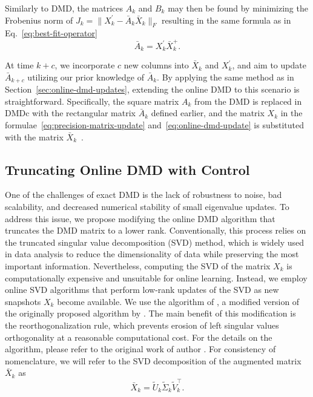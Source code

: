Similarly to DMD, the matrices \(A_k\) and \(B_k\) may then be found by minimizing the Frobenius norm of \(J_k = \|X^\prime_k - \bar{A}_k \bar{X}_k\|_F\) resulting in the same  formula as in Eq.~\eqref{eq:best-fit-operator}
\begin{equation*}
	\bar{A}_k = X^\prime_k \bar{X}_k^+.
\end{equation*}

At time \(k+c\), we incorporate \(c\) new columns into \(\bar{X}_k\) and \(X^\prime_k\), and aim to update \(\bar{A}_{k+c}\) utilizing our prior knowledge of \(\bar{A}_k\). By applying the same method as in Section~\ref{sec:online-dmd-updates}, extending the online DMD to this scenario is straightforward. Specifically, the square matrix \(A_k\) from the DMD is replaced in DMDc with the rectangular matrix \(\bar{A}_k\) defined earlier, and the matrix \(X_k\) in the formulae~\eqref{eq:precision-matrix-update} and~\eqref{eq:online-dmd-update} is substituted with the matrix \(\bar{X}_k\)~\citep{Zhang2019}.

\subsection{Truncating Online DMD with Control}\label{sec:truncating-online-dmd}
One of the challenges of exact DMD is the lack of robustness to noise, bad scalability, and decreased numerical stability of small eigenvalue updates. To address this issue, we propose modifying the online DMD algorithm that truncates the DMD matrix to a lower rank. Conventionally, this process relies on the truncated singular value decomposition (SVD) method, which is widely used in data analysis to reduce the dimensionality of data while preserving the most important information. Nevertheless, computing the SVD of the matrix \(X_k\) is computationally expensive and unsuitable for online learning. Instead, we employ online SVD algorithms that perform low-rank updates of the SVD as new snapshots \(X_k\) become available. We use the algorithm of \citet{Zhang2022}, a modified version of the originally proposed algorithm by \citet{Brand2006}. The main benefit of this modification is the reorthogonalization rule, which prevents erosion of left singular values orthogonality at a reasonable computational cost. For the details on the algorithm, please refer to the original work of author \citep{Zhang2022}. For consistency of nomenclature, we will refer to the SVD decomposition of the augmented matrix \(\bar{X}_k\) as
\begin{equation*}
	\bar{X}_k = \tilde{U}_k \tilde{\Sigma}_k \tilde{V}_k^\top.
\end{equation*}

